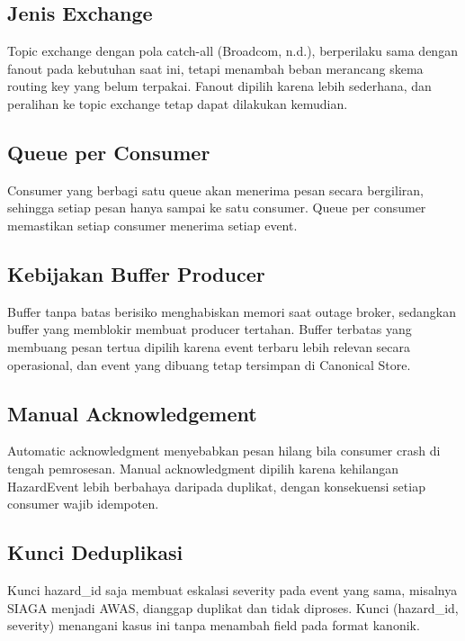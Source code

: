 \subsection{Jenis Exchange}

Topic exchange dengan pola catch-all (Broadcom, n.d.), berperilaku sama dengan fanout pada kebutuhan saat ini, tetapi menambah beban merancang skema routing key yang belum terpakai. Fanout dipilih karena lebih sederhana, dan peralihan ke topic exchange tetap dapat dilakukan kemudian.

\subsection{Queue per Consumer}

Consumer yang berbagi satu queue akan menerima pesan secara bergiliran, sehingga setiap pesan hanya sampai ke satu consumer. Queue per consumer memastikan setiap consumer menerima setiap event.

\subsection{Kebijakan Buffer Producer}

Buffer tanpa batas berisiko menghabiskan memori saat outage broker, sedangkan buffer yang memblokir membuat producer tertahan. Buffer terbatas yang membuang pesan tertua dipilih karena event terbaru lebih relevan secara operasional, dan event yang dibuang tetap tersimpan di Canonical Store.

\subsection{Manual Acknowledgement}

Automatic acknowledgment menyebabkan pesan hilang bila consumer crash di tengah pemrosesan. Manual acknowledgment dipilih karena kehilangan HazardEvent lebih berbahaya daripada duplikat, dengan konsekuensi setiap consumer wajib idempoten.

\subsection{Kunci Deduplikasi}

Kunci hazard\_id saja membuat eskalasi severity pada event yang sama, misalnya SIAGA menjadi AWAS, dianggap duplikat dan tidak diproses. Kunci (hazard\_id, severity) menangani kasus ini tanpa menambah field pada format kanonik.

